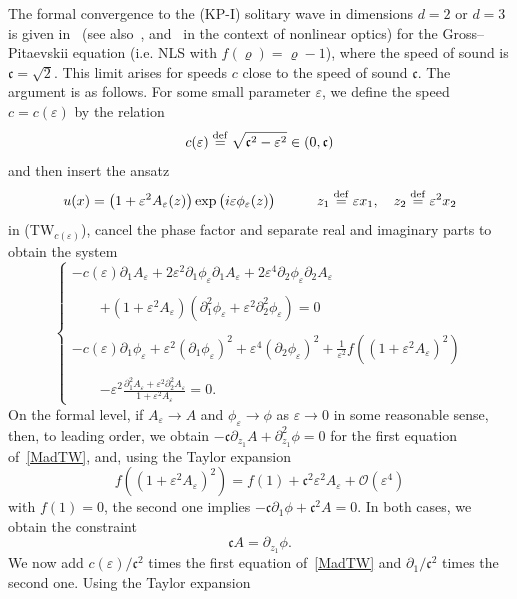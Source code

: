\documentclass[AHL,Unicode,longabstracts,published]{cedram}
\newcommand*\p{\partial}
\newcommand*\ddef{\stackrel{\rm def}{=}}
\newcommand*\BO{\mathcal{O}}
\newcommand*\ds{\displaystyle}
\newcommand*\cs{{\mathfrak c}}
\newcommand*\e{\varepsilon}
\begin{document}
The formal convergence to the (KP-I) solitary wave in dimensions $d= 2$ or $d=3$ is given in~\cite{JR} (see also~\cite{Ior_Smi}, and~\cite{Kiv-Pel} in the context of nonlinear optics) for the Gross--Pitaevskii equation (i.e. NLS with $ f(\varrho)= \varrho - 1 $), where the speed of sound is $ \cs = \sqrt{2} $. This limit arises for speeds $c$ close to the speed of sound $ \cs $. The argument is as follows. For some small parameter $ \e $, we define the speed $ c = c(\e) $ by the relation
\[
c(\e) \ddef \sqrt{\cs^2 - \e^2} \in (0, \cs)
\]
and then insert the ansatz
\begin{equation}\label{ansatzKP}
u(x) = \big(1 + \e^2 A_\e (z) \big)
\exp \big(i\e \phi_\e (z) \big) \qquad \quad z_1 \ddef \e x_1, \quad z_2 \ddef \e^2 x_2
\end{equation}
in (TW$_{c(\e)}$), cancel the phase factor and separate real and imaginary parts to obtain the system
\begin{equation}\label{MadTW}
\left\{
\begin{array}{ll}
\ds{ - c(\e) \p_{1} A_\e + 2 \e^2 \p_{1} \phi_\e \p_{1} A_\e + 2 \e^4 \p_{2} \phi_\e \p_{2} A_\e }
\\ \ \\ \quad \quad \ds{ + \left(1 + \e^2 A_\e\right) \left(\p_{1}^2 \phi_\e +
\e^2 \p^2_{2} \phi_\e \right)} = 0 \\ \ \\
\ds{ - c(\e) \p_{1} \phi_\e + \e^2 (\p_{1} \phi_\e)^2 + \e^4 (\p_{2} \phi_\e)^2 + \frac{1}{\e^2} f\left(\left(1 +\e^2 A_\e\right)^2 \right) }
\\ \ \\ \quad \quad \ds{ - \e^2 \frac{ \p_{1}^2 A_\e + \e^2 \p_{2}^2 A_\e}{1+\e^2 A_\e}} = 0.
\end{array}\right.
\end{equation}
On the formal level, if $A_\e \to A$ and $\phi_\e \to \phi $ as $\e \to 0$ in some reasonable sense, then, to leading order, we obtain $ - \cs \p_{z_1} A +\p^2_{z_1} \phi = 0 $ for the first equation of~\eqref{MadTW}, and, using the Taylor expansion
\[
f\left(\left(1 +\e^2 A_\e\right)^2 \right) = f(1) + \cs^2 \e^2 A_\e + \BO(\e^4)
\]
with $f(1)=0$, the second one implies $ - \cs \p_{1} \phi + \cs^2 A = 0$. In both cases, we obtain the constraint
\begin{equation}\label{prepar}
\cs A = \p_{z_1} \phi.
\end{equation} We now add $c(\e) / \cs^2 $ times the first equation of~\eqref{MadTW} and $\p_{1}/\cs^2 $ times the second one. Using the Taylor expansion
\end{document}
